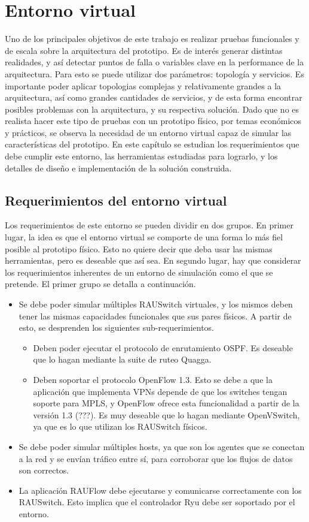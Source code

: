 \chapter{Entorno virtual}
Uno de los principales objetivos de este trabajo es realizar pruebas funcionales y de escala sobre la arquitectura del prototipo. Es de interés generar distintas realidades, y así detectar puntos de falla o variables clave en la performance de la arquitectura. Para esto se puede utilizar dos parámetros: topología y servicios. Es importante poder aplicar topologias complejas y relativamente grandes a la arquitectura, así como grandes cantidades de servicios, y de esta forma encontrar posibles problemas con la arquitectura, y su respectiva solución. Dado que no es realista hacer este tipo de pruebas con un prototipo físico, por temas económicos y prácticos, se observa la necesidad de un entorno virtual capaz de simular las características del prototipo. En este capítulo se estudian los requerimientos que debe cumplir este entorno, las herramientas estudiadas para lograrlo, y los detalles de diseño e implementación de la solución construida.

\section{Requerimientos del entorno virtual}
Los requerimientos de este entorno se pueden dividir en dos grupos. En primer lugar, la idea es que el entorno virtual se comporte de una forma lo más fiel posible al prototipo físico. Esto no quiere decir que deba usar las mismas herramientas, pero es deseable que así sea. En segundo lugar, hay que considerar los requerimientos inherentes de un entorno de simulación como el que se pretende. El primer grupo se detalla a continuación.

\begin{itemize}
	\item Se debe poder simular múltiples RAUSwitch virtuales, y los mismos deben tener las mismas capacidades funcionales que sus pares físicos. A partir de esto, se desprenden los siguientes sub-requerimientos.
	\begin{itemize}
		\item Deben poder ejecutar el protocolo de enrutamiento OSPF. Es deseable que lo hagan mediante la suite de ruteo Quagga.
		\item Deben soportar el protocolo OpenFlow 1.3. Esto se debe a que la aplicación que implementa VPNs depende de que los switches tengan soporte para MPLS, y OpenFlow ofrece esta funcionalidad a partir de la versión 1.3 (???). Es muy deseable que lo hagan mediante OpenVSwitch, ya que es lo que utilizan los RAUSwitch físicos.
	\end{itemize}
	\item Se debe poder simular múltiples hosts, ya que son los agentes que se conectan a la red y se envían tráfico entre sí, para corroborar que los flujos de datos son correctos.
	\item La aplicación RAUFlow debe ejecutarse y comunicarse correctamente con los RAUSwitch. Esto implica que el controlador Ryu debe ser soportado por el entorno.
\end{itemize}

